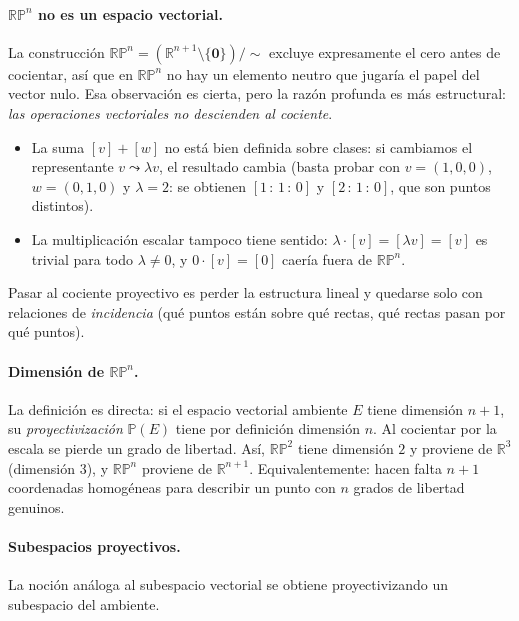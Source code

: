 \documentclass[11pt,a4paper]{article}
\newcommand{\RP}{\mathbb{RP}}
\newcommand{\R}{\mathbb{R}}
\newcommand{\hp}[3]{[#1\,{:}\,#2\,{:}\,#3]}
\begin{document}
\paragraph{$\RP^n$ no es un espacio vectorial.}
La construcción $\RP^n=(\R^{n+1}\setminus\{\mathbf 0\})/{\sim}$ excluye
expresamente el cero antes de cocientar, así que en $\RP^n$ no hay un
elemento neutro que jugaría el papel del vector nulo. Esa observación es
cierta, pero la razón profunda es más estructural: \emph{las operaciones
vectoriales no descienden al cociente}.
\begin{itemize}[leftmargin=1.4em,itemsep=1pt]
\item La suma $[v]+[w]$ no está bien definida sobre clases: si
  cambiamos el representante $v\leadsto\lambda v$, el resultado cambia
  (basta probar con $v=(1,0,0)$, $w=(0,1,0)$ y $\lambda=2$: se obtienen
  $\hp{1}{1}{0}$ y $\hp{2}{1}{0}$, que son puntos distintos).
\item La multiplicación escalar tampoco tiene sentido: $\lambda\cdot[v]=
  [\lambda v]=[v]$ es trivial para todo $\lambda\neq0$, y $0\cdot[v]=[0]$
  caería fuera de $\RP^n$.
\end{itemize}
Pasar al cociente proyectivo es perder la estructura lineal y quedarse
solo con relaciones de \emph{incidencia} (qué puntos están sobre qué
rectas, qué rectas pasan por qué puntos).

\paragraph{Dimensión de $\RP^n$.}
La definición es directa: si el espacio vectorial ambiente $E$ tiene
dimensión $n+1$, su \emph{proyectivización} $\mathbb P(E)$ tiene por
definición dimensión $n$. Al cocientar por la escala se pierde un grado
de libertad. Así, $\RP^2$ tiene dimensión $2$ y proviene de $\R^3$
(dimensión $3$), y $\RP^n$ proviene de $\R^{n+1}$. Equivalentemente: hacen
falta $n+1$ coordenadas homogéneas para describir un punto con $n$ grados
de libertad genuinos.

\paragraph{Subespacios proyectivos.}
La noción análoga al subespacio vectorial se obtiene proyectivizando un
subespacio del ambiente.
\end{document}
